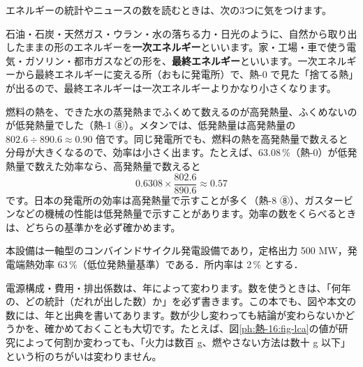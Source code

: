\leavevmode\label{ph:熱-16:sec8}エネルギーの統計やニュースの数を読むときは、次の3つに気をつけます。

石油・石炭・天然ガス・ウラン・水の落ちる力・日光のように、自然から取り出したままの形のエネルギーを\textbf{一次エネルギー}といいます。家・工場・車で使う電気・ガソリン・都市ガスなどの形を、\textbf{最終エネルギー}といいます。一次エネルギーから最終エネルギーに変える所（おもに発電所）で、熱-0 で見た「捨てる熱」が出るので、最終エネルギーは一次エネルギーよりかなり小さくなります。

燃料の熱を、できた水の蒸発熱までふくめて数えるのが高発熱量、ふくめないのが低発熱量でした（熱-1 ⑧）。メタンでは、低発熱量は高発熱量の $802.6\div890.6\approx0.90$ 倍です。同じ発電所でも、燃料の熱を高発熱量で数えると分母が大きくなるので、効率は小さく出ます。たとえば、63.08\,\%（熱-0）が低発熱量で数えた効率なら、高発熱量で数えると
\[0.6308\times\frac{802.6}{890.6}\approx0.57\]
です。日本の発電所の効率は高発熱量で示すことが多く（熱-8 ⑧）、ガスタービンなどの機械の性能は低発熱量で示すことがあります。効率の数をくらべるときは、どちらの基準かを必ず確かめます。

\begin{senmonsho}[発電設備の仕様の書き方]
\begin{bkhonbun}
本設備は一軸型のコンバインドサイクル発電設備であり，定格出力 500 MW，発電端熱効率 63\,\%（低位発熱量基準）である．所内率は 2\,\% とする．
\end{bkhonbun}
\end{senmonsho}

電源構成・費用・排出係数は、年によって変わります。数を使うときは、「何年の、どの統計（だれが出した数）か」を必ず書きます。この本でも、図や本文の数には、年と出典を書いてあります。数が少し変わっても結論が変わらないかどうかを、確かめておくことも大切です。たとえば、図\ref{ph:熱-16:fig-lca}の値が研究によって何割か変わっても、「火力は数百 g、燃やさない方法は数十 g 以下」という桁のちがいは変わりません。

